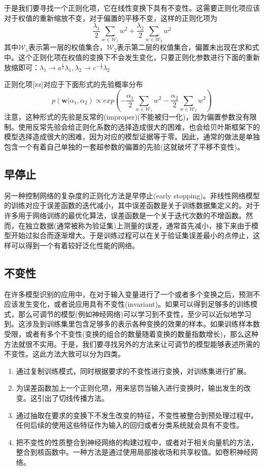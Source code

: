 于是我们要寻找一个正则化项，它在线性变换下具有不变性。这需要正则化项应该对于权值的重新缩放不变，对于偏置的平移不变，这样的正则化项为
\begin{equation}
\label{zz}
	\frac{\lambda_1}{2}\sum_{w\in \mathcal{W}_1}w^2+\frac{\lambda_2}{2}\sum_{w\in \mathcal{W}_2}w^2
\end{equation}
其中$\mathcal{W}_1$表示第一层的权值集合，$\mathcal{W}_2$表示第二层的权值集合，偏置未出现在求和式中。这个正则化项在权值的变换下不会发生变化，只要正则化参数进行下面的重新放缩即可：$\lambda_1 \rightarrow a^{\frac{1}{2}}\lambda_1,\lambda_2\to c^{-\frac{1}{2}}\lambda_2$

正则化项$\ref{zz}$对应于下面形式的先验概率分布
\begin{equation}
	p(\boldsymbol{w}|\alpha_1,\alpha_2)\propto exp\left(-\frac{\alpha_1}{2}\sum_{w\in \mathcal{W}_1}w^2-\frac{\alpha_2}{2}\sum_{w\in \mathcal{W}_2}w^2 \right)
\end{equation}
注意，这种形式的先验是反常的(improper)(不能被归一化)，因为偏置参数没有限制。使用反常先验会给正则化系数的选择造成很大的困难，也会给贝叶斯框架下的模型选择造成很大的困难，因为对应的模型证据等于零。因此，通常的做法是单独包含一个有着自己单独的一套超参数的偏置的先验(这就破坏了平移不变性)。
\subsection*{早停止}
另一种控制网络的复杂度的正则化方法是早停止(early stopping)。非线性网络模型的训练对应于误差函数的迭代减小，其中误差函数是关于训练数据集定义的。对于许多用于网络训练的最优化算法，误差函数是一个关于迭代次数的不增函数。然而，在独立数据(通常被称为验证集)上测量的误差，通常首先减小，接下来由于模型开始过拟合而逐渐增大。于是训练过程可以在关于验证集误差最小的点停止，这样可以得到一个有着较好泛化性能的网络。
\subsection*{不变性}
在许多模型识别的应用中，在对于输入变量进行了一个或者多个变换之后，预测不应该发生变化，或者说应用具有不变性(invariant)。如果可以得到足够多的训练模式，那么可调节的模型(例如神经网络)可以学习到不变性，至少可以近似地学习到。这涉及到训练集里包含足够多的表示各种变换的效果的样本。如果训练样本数受限，或者有多个不变性(变换的组合的数量随着变换的数量指数增长)，那么这种方法就很不实用。于是，我们要寻找另外的方法来让可调节的模型能够表述所需的不变性。这此方法大致可以分为四类。
\begin{enumerate}
	\item 通过复制训练模式，同时根据要求的不变性进行变换，对训练集进行扩展。
	\item 为误差函数加上一个正则化项，用来惩罚当输入进行变换时，输出发生的改变。这引出了切线传播方法。
	\item 通过抽取在要求的变换下不发生改变的特征，不变性被整合到预处理过程中。任何后续的使用这些特征作为输入的回归或者分类系统就会具有不变性。
	\item 把不变性的性质整合到神经网络的构建过程中，或者对于相关向量机的方法，整合到核函数中。一种方法是通过使用局部接收场和共享权值。如卷积神经网络。
\end{enumerate}
